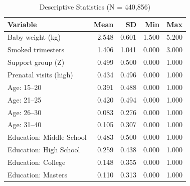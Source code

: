 \begin{table}[h!]
\centering
\caption{Descriptive Statistics (N = 440,856)} 
\label{tab:descriptive}
\begingroup\small
\begin{tabular}{lrrrr}
  \toprule
Variable & Mean & SD & Min & Max \\ 
  \midrule
Baby weight (kg) & 2.548 & 0.601 & 1.500 & 5.200 \\ 
  Smoked trimesters & 1.406 & 1.041 & 0.000 & 3.000 \\ 
  Support group (Z) & 0.499 & 0.500 & 0.000 & 1.000 \\ 
  Prenatal visits (high) & 0.434 & 0.496 & 0.000 & 1.000 \\ 
  Age: 15--20 & 0.391 & 0.488 & 0.000 & 1.000 \\ 
  Age: 21--25 & 0.420 & 0.494 & 0.000 & 1.000 \\ 
  Age: 26--30 & 0.083 & 0.276 & 0.000 & 1.000 \\ 
  Age: 31--40 & 0.105 & 0.307 & 0.000 & 1.000 \\ 
  Education: Middle School & 0.483 & 0.500 & 0.000 & 1.000 \\ 
  Education: High School & 0.259 & 0.438 & 0.000 & 1.000 \\ 
  Education: College & 0.148 & 0.355 & 0.000 & 1.000 \\ 
  Education: Masters & 0.110 & 0.313 & 0.000 & 1.000 \\ 
   \bottomrule
\end{tabular}
\endgroup
\end{table}
